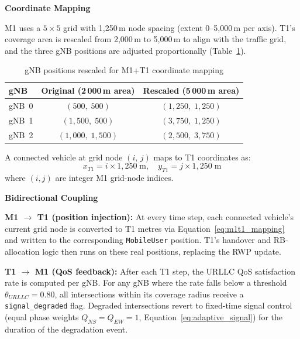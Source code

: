 \medskip\noindent\textbf{Coordinate Mapping}

M1 uses a $5 \times 5$ grid with 1{,}250\,m node spacing (extent 0--5{,}000\,m per axis). T1's coverage area is rescaled from 2{,}000\,m to 5{,}000\,m to align with the traffic grid, and the three gNB positions are adjusted proportionally (Table~\ref{tab:m1t1_gnb}).

\begin{table}[h]
    \centering
    \caption{gNB positions rescaled for M1+T1 coordinate mapping}
    \label{tab:m1t1_gnb}
    \small
    \begin{tabular}{|l|c|c|}
        \hline
        \textbf{gNB} & \textbf{Original (2\,000\,m area)} & \textbf{Rescaled (5\,000\,m area)} \\
        \hline
        gNB~0 & $(500,\;500)$ & $(1{,}250,\;1{,}250)$ \\
        \hline
        gNB~1 & $(1{,}500,\;500)$ & $(3{,}750,\;1{,}250)$ \\
        \hline
        gNB~2 & $(1{,}000,\;1{,}500)$ & $(2{,}500,\;3{,}750)$ \\
        \hline
    \end{tabular}
\end{table}

A connected vehicle at grid node $(i,\,j)$ maps to T1 coordinates as:
\begin{equation}
    x_{T1} = i \times 1{,}250\;\text{m}, \quad y_{T1} = j \times 1{,}250\;\text{m}
    \label{eq:m1t1_mapping}
\end{equation}
where $(i,j)$ are integer M1 grid-node indices.

\medskip\noindent\textbf{Bidirectional Coupling}

\textbf{M1 $\rightarrow$ T1 (position injection):} At every time step, each connected vehicle's current grid node is converted to T1 metres via Equation~\ref{eq:m1t1_mapping} and written to the corresponding \texttt{MobileUser} position. T1's handover and RB-allocation logic then runs on these real positions, replacing the RWP update.

\textbf{T1 $\rightarrow$ M1 (QoS feedback):} After each T1 step, the URLLC QoS satisfaction rate is computed per gNB. For any gNB where the rate falls below a threshold $\theta_{URLLC} = 0.80$, all intersections within its coverage radius receive a \texttt{signal\_degraded} flag. Degraded intersections revert to fixed-time signal control (equal phase weights $Q_{NS} = Q_{EW} = 1$, Equation~\ref{eq:adaptive_signal}) for the duration of the degradation event.

